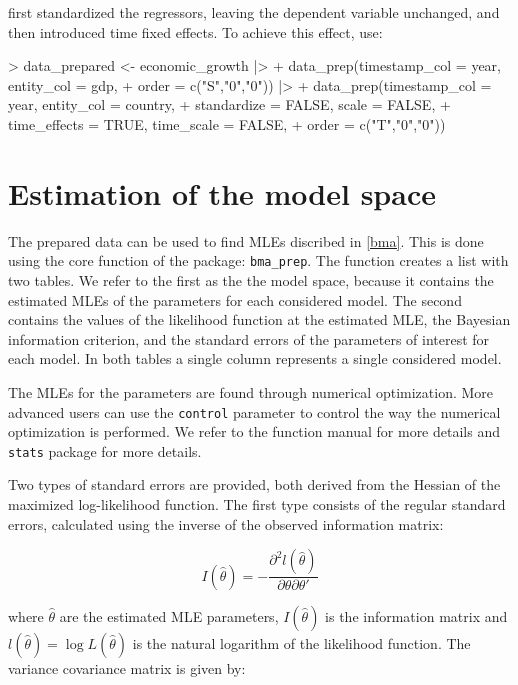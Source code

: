 \documentclass[a4paper]{article}
\begin{document}
\citet{Moral+2016} first standardized the regressors, leaving the dependent variable unchanged, and then introduced time fixed effects.
To achieve this effect, use:

\begin{Schunk}
\begin{Sinput}
> data_prepared <- economic_growth |>
+     data_prep(timestamp_col = year, entity_col = gdp,
+               order = c("S","0","0")) |>
+     data_prep(timestamp_col = year, entity_col = country,
+               standardize = FALSE, scale = FALSE,
+               time_effects = TRUE, time_scale = FALSE,
+               order = c("T","0","0"))
\end{Sinput}
\end{Schunk}

\section{Estimation of the model space}\label{model_space}

The prepared data can be used to find MLEs discribed in \autoref{bma}.
This is done using the core function of the package: \verb+bma_prep+.
The function creates a list with two tables.
We refer to the first as the the model space,
because it contains the estimated MLEs of the parameters for each considered model.
The second contains the values of the likelihood function at the estimated MLE,
the Bayesian information criterion,
and the standard errors of the parameters of interest for each model.
In both tables a single column represents a single considered model.

The MLEs for the parameters are found through numerical optimization.
More advanced users can use the \verb+control+ parameter to control the way the numerical optimization is performed.
We refer to the function manual for more details and \verb+stats+ package for more details.

Two types of standard errors are provided,
both derived from the Hessian of the maximized log-likelihood function.
The first type consists of the regular standard errors,
calculated using the inverse of the observed information matrix:

\begin{equation}
I(\hat{\theta}) = -\frac{\partial^2 l(\hat{\theta})}{\partial \theta \partial \theta'}
\end{equation}

\noindent where $\hat{\theta}$ are the estimated MLE parameters,
$I(\hat{\theta})$ is the information matrix
and $l(\hat{\theta}) = \log L(\hat{\theta})$ is the natural logarithm of the likelihood function.
The variance covariance matrix is given by:
\end{document}

